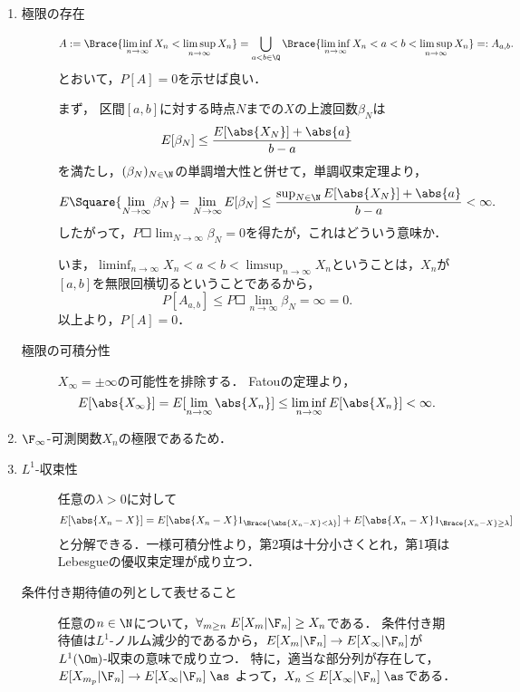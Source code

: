 \documentclass[uplatex,dvipdfmx]{jsreport}
\begin{document}
\begin{Proof}\mbox{}
    \begin{enumerate}
        \item \begin{description}
            \item[極限の存在] \[A:=\Brace{\liminf_{n\to\infty}X_n<\limsup_{n\to\infty}X_n}=\bigcup_{a<b\in\Q}\Brace{\liminf_{n\to\infty}X_n<a<b<\limsup_{n\to\infty}X_n}=:A_{a,b}.\]
            とおいて，$P[A]=0$を示せば良い．

            まず，
            区間$[a,b]$に対する時点$N$までの$X$の上渡回数$\beta_N$は
            \[E[\beta_N]\le\frac{E[\abs{X_N}]+\abs{a}}{b-a}\]
            を満たし，$(\beta_N)_{N\in\N}$の単調増大性と併せて，単調収束定理より，
            \[E\Square{\lim_{N\to\infty}\beta_N}=\lim_{N\to\infty}E[\beta_N]\le\frac{\sup_{N\in\N}E[\abs{X_N}]+\abs{a}}{b-a}<\infty.\]
            したがって，$P\Square{\lim_{N\to\infty}\beta_N}=0$を得たが，これはどういう意味か．

            いま，$\liminf_{n\to\infty}X_n<a<b<\limsup_{n\to\infty}X_n$ということは，$X_n$が$[a,b]$を無限回横切るということであるから，
            \[P[A_{a,b}]\le P\Square{\lim_{n\to\infty}\beta_N=\infty}=0.\]
            以上より，$P[A]=0$．
            \item[極限の可積分性] $X_\infty=\pm\infty$の可能性を排除する．
            Fatouの定理より，
            \[E[\abs{X_\infty}]=E[\lim_{n\to\infty}\abs{X_n}]\le\liminf_{n\to\infty}E[\abs{X_n}]<\infty.\]
        \end{description}
        \item $\F_\infty$-可測関数$X_n$の極限であるため．
        \item 
        \begin{description}
            \item[$L^1$-収束性] 任意の$\lambda>0$に対して
            \[E[\abs{X_n-X}]=E[\abs{X_n-X}1_{\Brace{\abs{X_n-X}<\lambda}}]+E[\abs{X_n-X}1_{\Brace{X_n-X}\ge\lambda}]\]
            と分解できる．一様可積分性より，第2項は十分小さくとれ，第1項はLebesgueの優収束定理が成り立つ．
            \item[条件付き期待値の列として表せること] 任意の$n\in\N$について，$\forall_{m\ge n}\;E[X_m|\F_n]\ge X_n$である．
            条件付き期待値は$L^1$-ノルム減少的であるから，$E[X_m|\F_n]\to E[X_\infty|\F_n]$が$L^1(\Om)$-収束の意味で成り立つ．
            特に，適当な部分列が存在して，$E[X_{m_p}|\F_n]\to E[X_\infty|\F_n]\;\as$
            よって，$X_n\le E[X_\infty|\F_n]\;\as$である．
        \end{description}
    \end{enumerate}
\end{Proof}
\end{document}
